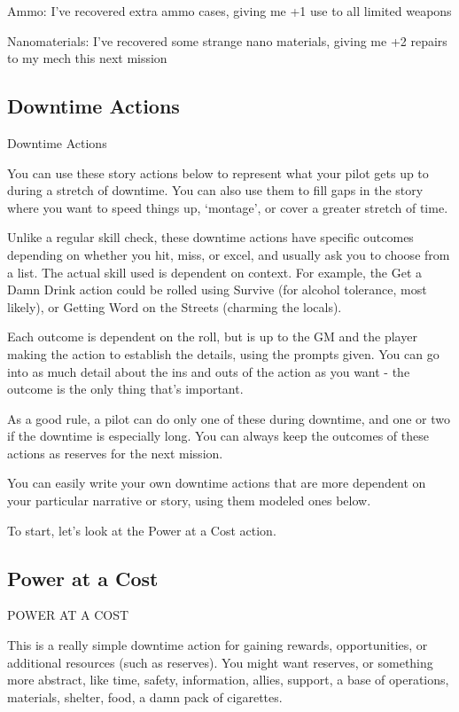 	        Ammo: I’ve recovered extra ammo cases, giving me +1 use to all limited weapons
 
	        Nanomaterials: I’ve recovered some strange nano materials, giving me +2 repairs to my  
mech this next mission  

                                                                                                                 

\subsection{Downtime Actions}

                                           Downtime Actions
 

You can use these story actions below to represent what your pilot gets up to during a stretch of  
downtime. You can also use them to fill gaps in the story where you want to speed things up,  
‘montage’, or cover a greater stretch of time.
 

Unlike a regular skill check, these downtime actions have specific outcomes depending on  
whether you hit, miss, or excel, and usually ask you to choose from a list. The actual skill used is  
dependent on context. For example, the Get a Damn Drink action could be rolled using Survive  
(for alcohol tolerance, most likely), or Getting Word on the Streets (charming the locals).
 

Each outcome is dependent on the roll, but is up to the GM and the player making the action to  
establish the details, using the prompts given. You can go into as much detail about the ins and  
outs of the action as you want - the outcome is the only thing that’s important.  

As a good rule, a pilot can do only one of these during downtime, and one or two if the downtime  
is especially long. You can always keep the outcomes of these actions as reserves for the next  
mission.  

You can easily write your own downtime actions that are more dependent on your particular  
narrative or story, using them modeled ones below.  

To start, let’s look at the Power at a Cost action.  

\subsection{Power at a Cost}
POWER AT A COST  

This is a really simple downtime action for gaining rewards, opportunities, or additional  
resources (such as reserves). You might want reserves, or something more abstract, like time,  
safety, information, allies, support, a base of operations, materials, shelter, food, a damn  
pack of cigarettes.
 

